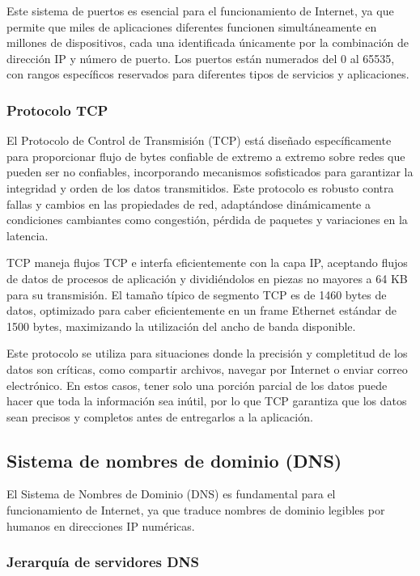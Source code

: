Este sistema de puertos es esencial para el funcionamiento de Internet, ya que permite que miles de aplicaciones diferentes funcionen simultáneamente en millones de dispositivos, cada una identificada únicamente por la combinación de dirección IP y número de puerto. Los puertos están numerados del 0 al 65535, con rangos específicos reservados para diferentes tipos de servicios y aplicaciones.

\subsubsection{Protocolo TCP}

El Protocolo de Control de Transmisión (TCP) está diseñado específicamente para proporcionar flujo de bytes confiable de extremo a extremo sobre redes que pueden ser no confiables, incorporando mecanismos sofisticados para garantizar la integridad y orden de los datos transmitidos. Este protocolo es robusto contra fallas y cambios en las propiedades de red, adaptándose dinámicamente a condiciones cambiantes como congestión, pérdida de paquetes y variaciones en la latencia.

TCP maneja flujos TCP e interfa eficientemente con la capa IP, aceptando flujos de datos de procesos de aplicación y dividiéndolos en piezas no mayores a 64 KB para su transmisión. El tamaño típico de segmento TCP es de 1460 bytes de datos, optimizado para caber eficientemente en un frame Ethernet estándar de 1500 bytes, maximizando la utilización del ancho de banda disponible.

Este protocolo se utiliza para situaciones donde la precisión y completitud de los datos son críticas, como compartir archivos, navegar por Internet o enviar correo electrónico. En estos casos, tener solo una porción parcial de los datos puede hacer que toda la información sea inútil, por lo que TCP garantiza que los datos sean precisos y completos antes de entregarlos a la aplicación.

\subsection{Sistema de nombres de dominio (DNS)}

El Sistema de Nombres de Dominio (DNS) es fundamental para el funcionamiento de Internet, ya que traduce nombres de dominio legibles por humanos en direcciones IP numéricas.

\subsubsection{Jerarquía de servidores DNS}

